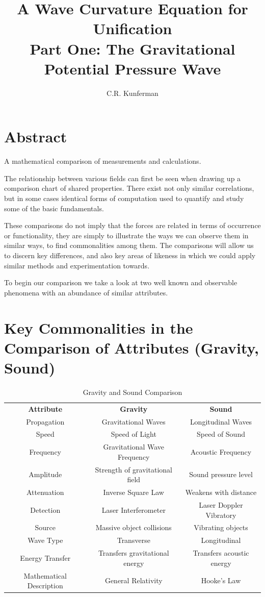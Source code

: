 \documentclass[12pt]{article}
\title{A Wave Curvature Equation for Unification\\
\large Part One: The Gravitational Potential Pressure Wave}
\author{C.R. Kunferman}
\date{}
\begin{document}
\maketitle

\section*{Abstract}

A mathematical comparison of measurements and calculations.

The relationship between various fields can first be seen when drawing up a comparison chart of shared properties. There exist not only similar correlations, but in some cases identical forms of computation used to quantify and study some of the basic fundamentals.

These comparisons do not imply that the forces are related in terms of occurrence or functionality, they are simply to illustrate the ways we can observe them in similar ways, to find commonalities among them. The comparisons will allow us to discern key differences, and also key areas of likeness in which we could apply similar methods and experimentation towards.

To begin our comparison we take a look at two well known and observable phenomena with an abundance of similar attributes.

\section*{Key Commonalities in the Comparison of Attributes (Gravity, Sound)}


\begin{table}
    \centering
    \begin{tabular}{ccc}
        \textbf{Attribute} & \textbf{Gravity} & \textbf{Sound} \\
Propagation & Gravitational Waves & Longitudinal Waves \\
Speed & Speed of Light & Speed of Sound \\
Frequency & Gravitational Wave Frequency & Acoustic Frequency \\
Amplitude & Strength of gravitational field & Sound pressure level \\
Attenuation & Inverse Square Law & Weakens with distance \\
Detection & Laser Interferometer & Laser Doppler Vibratory \\
Source & Massive object collisions & Vibrating objects \\
Wave Type & Transverse & Longitudinal \\
Energy Transfer & Transfers gravitational energy & Transfers acoustic energy \\
Mathematical Description & General Relativity & Hooke's Law \\
    \end{tabular}
    \caption{Gravity and Sound Comparison}
    \label{tab:Comparison Table 1}
\end{table}
\end{document}
